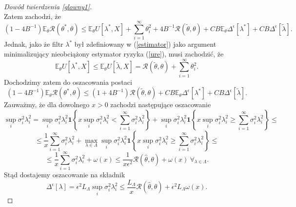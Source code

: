 \documentclass{article}
\begin{document}
\begin{proof}[Dowód twierdzenia \ref{glowny1}]
\begin{displaymath}
\end{displaymath}
Zatem zachodzi, że
\begin{displaymath}
(1-4B^{-1})\mathbb{E}_{\theta}\mathcal{R}(\theta^*,\theta)\leq \mathbb{E}_{\theta}U[\lambda^*,X]+\sum_{i=1}^{\infty}\theta_i^2+4B^{-1}\mathcal{R}(\tilde{\theta},\theta)+CB\mathbb{E}_{\theta}\Delta^{\epsilon}[\lambda^*]+CB\Delta^{\epsilon}[\tilde{\lambda}].
\end{displaymath}
Jednak, jako że filtr $\lambda^*$ był zdefiniowany w (\ref{estimator}) jako argument minimalizujący nieobciążony estymator ryzyka (\ref{ure}), musi zachodzić, że
\begin{displaymath}
\mathbb{E}_{\theta}U[\lambda^*,X]\leq \mathbb{E}_{\theta}U[\tilde{\lambda},X]=\mathcal{R}(\tilde{\theta},\theta)+\sum_{i=1}^{\infty}\theta_i^2.
\end{displaymath}
Dochodzimy zatem do oszacowania postaci 
\begin{equation}\label{szacowanie4}
(1-4B^{-1})\mathbb{E}_{\theta}\mathcal{R}(\theta^*,\theta)\leq (1+4B^{-1})\mathcal{R}(\tilde{\theta},\theta)+CB\mathbb{E}_{\theta}\Delta^{\epsilon}[\lambda^*]+CB\Delta^{\epsilon}[\tilde{\lambda}].
\end{equation}
Zauważmy, że dla dowolnego $x>0$ zachodzi następujące oszacowanie
\begin{displaymath}
\sup_i\sigma_i^2\lambda_i^2=\sup_i\sigma_i^2\lambda_i^2\pmb{1}\left\{x\sup_i\sigma_i^2\lambda_i^2<\sum_{i=1}^{\infty}\sigma_i^2\lambda_i^2\right\}+\sup_i\sigma_i^2\lambda_i^2\pmb{1}\left\{x\sup_i\sigma_i^2\lambda_i^2\geq \sum_{i=1}^{\infty}\sigma_i^2\lambda_i^2\right\}\leq
\end{displaymath}
\begin{displaymath}
\leq \frac{1}{x}\sum_{i=1}^{\infty}\sigma_i^2\lambda_i^2+\max_{\lambda\in \Lambda}\sup_i\sigma_i^2\lambda_i^2\pmb{1}\left\{x\sup_i\sigma_i^2\lambda_i^2\geq \sum_{i=1}^{\infty}\sigma_i^2\lambda_i^2\right\}\leq
\end{displaymath}
\begin{displaymath}
\leq \frac{1}{x}\sum_{i=1}^{\infty}\sigma_i^2\lambda_i^2+\omega (x)\leq \frac{1}{x\epsilon^2}\mathcal{R}(\hat{\theta},\theta)+\omega (x)\ \forall_{\lambda\in \Lambda}.
\end{displaymath}
Stąd dostajemy oszacowanie na składnik
\begin{displaymath}
\Delta^{\epsilon}[\lambda]=\epsilon^2 L_{\Lambda}\sup_i\sigma_i^2\lambda_i^2\leq \frac{L_{\Lambda}}{x}\mathcal{R}(\hat{\theta},\theta)+\epsilon^2L_{\Lambda}\omega (x).
\end{displaymath}

\end{proof}
\end{document}
